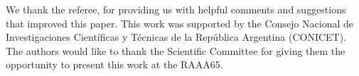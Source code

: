 \documentclass[baaa]{baaa}
\begin{document}
\begin{acknowledgement}
We thank the referee, for providing us with helpful comments and suggestions that improved this paper.
This work was supported by the Consejo Nacional de Investigaciones Cient\'ificas y T\'ecnicas de la Rep\'ublica Argentina (CONICET).
The authors would like to thank the Scientific Committee for giving them the opportunity to present this work at the RAAA65.
\end{acknowledgement}



\small

 
\end{document}
